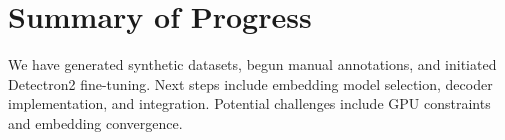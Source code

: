 \documentclass[11pt]{article}
\begin{document}
\section{Summary of Progress}
We have generated synthetic datasets, begun manual annotations, and initiated Detectron2 fine-tuning. Next steps include embedding model selection, decoder implementation, and integration. Potential challenges include GPU constraints and embedding convergence.

\appendix
\nocite{bendeck2024gpt4vis, masry2023unichart, chartassistant_dataset, huang2023layoutlmv3, huang2024survey, li2024visualizationliteracy, liu2023vectordbsurvey, lin2024chartinstruct, zhang2024chartassistant, zhang2024mmgem}



\end{document}
